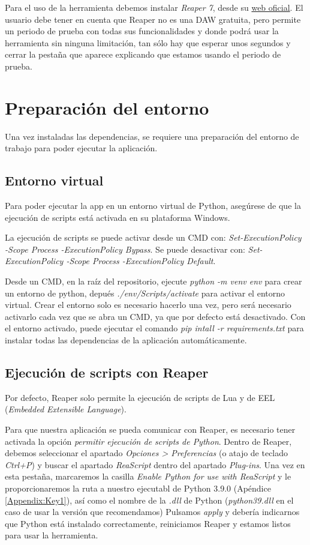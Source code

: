     Para el uso de la herramienta debemos instalar \textit{Reaper 7}, desde su \href{https://www.reaper.fm/download.php}{web oficial}. El usuario debe tener en cuenta que Reaper no es una DAW gratuita, pero permite un periodo de prueba con todas sus funcionalidades y donde podrá usar la herramienta sin ninguna limitación, tan sólo hay que esperar unos segundos y cerrar la pestaña que aparece explicando que estamos usando el periodo de prueba.


\section{Preparación del entorno}
\label{sec:app:preparacionEntorno}
Una vez instaladas las dependencias, se requiere una preparación del entorno de trabajo para poder ejecutar la aplicación.

\subsection{Entorno virtual}
Para poder ejecutar la app en un entorno virtual de Python, asegúrese de que la ejecución de scripts está activada en su plataforma Windows. 

La ejecución de scripts se puede activar desde un CMD con:
\textit{Set-ExecutionPolicy -Scope Process -ExecutionPolicy Bypass}.
Se puede desactivar con:
\textit{Set-ExecutionPolicy -Scope Process -ExecutionPolicy Default}.

Desde un CMD, en la raíz del repositorio, ejecute \textit{python -m venv env} para crear un entorno de python, depués \textit{./env/Scripts/activate} para activar el entorno virtual. Crear el entorno solo es necesario hacerlo una vez, pero será necesario activarlo cada vez que se abra un CMD, ya que por defecto está desactivado. Con el entorno activado, puede ejecutar el comando \textit{pip intall -r requirements.txt} para instalar todas las dependencias de la aplicación automáticamente.

\subsection{Ejecución de scripts con Reaper}
Por defecto, Reaper solo permite la ejecución de scripts de Lua y de EEL (\textit{Embedded Extensible Language}).

Para que nuestra aplicación se pueda comunicar con Reaper, es necesario tener activada la opción \textit{permitir ejecución de scripts de Python}. Dentro de Reaper, debemos seleccionar el apartado \textit{Opciones > Preferencias} (o atajo de teclado\textit{ Ctrl+P}) y buscar el apartado \textit{ReaScript} dentro del apartado \textit{Plug-ins}. Una vez en esta pestaña, marcaremos la casilla \textit{Enable Python for use with ReaScript} y le proporcionaremos la ruta a nuestro ejecutabl de Python 3.9.0 (Apéndice \ref{Appendix:Key1}), así como el nombre de la \textit{.dll} de Python (\textit{python39.dll} en el caso de usar la versión que recomendamos) Pulsamos \textit{apply} y debería indicarnos que Python está instalado correctamente, reiniciamos Reaper y estamos listos para usar la herramienta.

